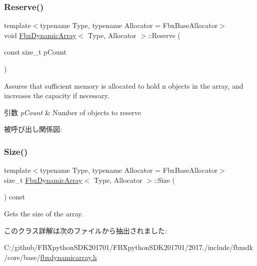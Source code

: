 \subsubsection{\texorpdfstring{Reserve()}{Reserve()}}
{\footnotesize\ttfamily template$<$typename Type, typename Allocator = Fbx\+Base\+Allocator$>$ \\
void \hyperlink{class_fbx_dynamic_array}{Fbx\+Dynamic\+Array}$<$ Type, Allocator $>$\+::Reserve (\begin{DoxyParamCaption}\item[{const size\+\_\+t}]{p\+Count }\end{DoxyParamCaption})}

Assures that sufficient memory is allocated to hold n objects in the array, and increases the capacity if necessary. 
\begin{DoxyParams}{引数}
{\em p\+Count} & Number of objects to reserve \\
\hline
\end{DoxyParams}
被呼び出し関係図\+:
\mbox{\label{class_fbx_dynamic_array_a700fb46d36230bd9ed41f6c6fb420d0b}} 
\subsubsection{\texorpdfstring{Size()}{Size()}}
{\footnotesize\ttfamily template$<$typename Type, typename Allocator = Fbx\+Base\+Allocator$>$ \\
size\+\_\+t \hyperlink{class_fbx_dynamic_array}{Fbx\+Dynamic\+Array}$<$ Type, Allocator $>$\+::Size (\begin{DoxyParamCaption}{ }\end{DoxyParamCaption}) const}



Gets the size of the array. 



このクラス詳解は次のファイルから抽出されました\+:\begin{DoxyCompactItemize}
\item 
C\+:/github/\+F\+B\+Xpython\+S\+D\+K201701/\+F\+B\+Xpython\+S\+D\+K201701/2017./include/fbxsdk/core/base/\hyperlink{fbxdynamicarray_8h}{fbxdynamicarray.\+h}\end{DoxyCompactItemize}

